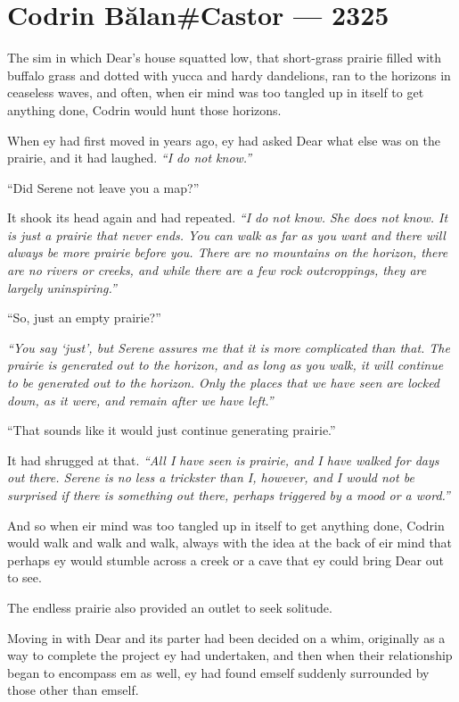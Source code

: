 \hypertarget{codrin-bux103lancastor-2325}{%
\chapter{Codrin Bălan\#Castor — 2325}\label{codrin-bux103lancastor-2325}}

The sim in which Dear's house squatted low, that short-grass prairie filled with buffalo grass and dotted with yucca and hardy dandelions, ran to the horizons in ceaseless waves, and often, when eir mind was too tangled up in itself to get anything done, Codrin would hunt those horizons.

When ey had first moved in years ago, ey had asked Dear what else was on the prairie, and it had laughed. \emph{``I do not know.''}

``Did Serene not leave you a map?''

It shook its head again and had repeated. \emph{``I do not know. She does not know. It is just a prairie that never ends. You can walk as far as you want and there will always be more prairie before you. There are no mountains on the horizon, there are no rivers or creeks, and while there are a few rock outcroppings, they are largely uninspiring.''}

``So, just an empty prairie?''

\emph{``You say `just', but Serene assures me that it is more complicated than that. The prairie is generated out to the horizon, and as long as you walk, it will continue to be generated out to the horizon. Only the places that we have seen are locked down, as it were, and remain after we have left.''}

``That sounds like it would just continue generating prairie.''

It had shrugged at that. \emph{``All I have seen is prairie, and I have walked for days out there. Serene is no less a trickster than I, however, and I would not be surprised if there is something out there, perhaps triggered by a mood or a word.''}

And so when eir mind was too tangled up in itself to get anything done, Codrin would walk and walk and walk, always with the idea at the back of eir mind that perhaps ey would stumble across a creek or a cave that ey could bring Dear out to see.

The endless prairie also provided an outlet to seek solitude.

Moving in with Dear and its parter had been decided on a whim, originally as a way to complete the project ey had undertaken, and then when their relationship began to encompass em as well, ey had found emself suddenly surrounded by those other than emself.

